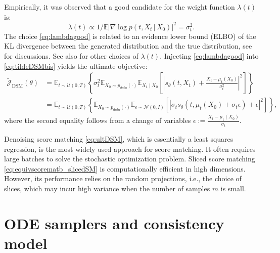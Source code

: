 \documentclass[letterpaper,11pt,reqno]{amsart}
\numberwithin{equation}{section}
\begin{document}
\quad Empirically,
it was observed \cite{Song20} that 
a good candidate for the weight function $\lambda(t)$ is:
\begin{equation}
\label{eq:lambdagood}
\lambda(t) \propto 1 / \mathbb{E}\left|\nabla \log p(t,X_t \,|\, X_0)\right|^2=\sigma_t^2.
\end{equation}
The choice \eqref{eq:lambdagood}
is related to an evidence lower bound (ELBO) of 
the KL divergence between the generated distribution and the true distribution, 
see \cite{huang2021variational, luo2022understanding, Song21} for discussions.
See also \cite{KG23} for other choices of $\lambda(t)$.
Injecting \eqref{eq:lambdagood} into \eqref{eq:tildeDSMbis}
yields the ultimate objective:
\begin{equation}
\label{eq:ultDSM}
\begin{aligned}
\tilde{\mathcal{J}}_{\text{DSM}}(\theta)&=\mathbb{E}_{t\sim\mathcal{U}(0, T)}\left\{\sigma_t^2 \mathbb{E}_{X_0\sim p_{data}(\cdot)} \mathbb{E}_{X_t \mid X_0}\left[\left|s_{\theta}(t,X_t) + \frac{X_t - \mu_t(X_0)}{\sigma_t^2}\right|^2\right]\right\}\\
& = \mathbb{E}_{t\sim\mathcal{U}(0, T)}\left\{ \mathbb{E}_{X_0\sim p_{data}(\cdot)} \mathbb{E}_{\epsilon \sim\mathcal{N}(0,I)}\left[\left|\sigma_t s_{\theta}(t,\mu_{t}(X_0)+\sigma_t\epsilon)+\epsilon \right|^2\right]\right\},
\end{aligned}
\end{equation}
where the second equality 
follows from a change of variables $\epsilon:= \frac{X_t - \mu_t(X_0)}{\sigma_t}$.

\quad Denoising score matching  \eqref{eq:ultDSM}, which is essentially a least squares regression, 
is the most widely used approach for score matching.
It often requires large batches to solve the stochastic optimization problem.
Sliced score matching \eqref{eq:equivscorematb_slicedSM} is computationally efficient in high dimensions.
However, its performance relies on the random projections, i.e., the choice of slices,
which may incur high variance when the number of samples $m$ is small.


\section{ODE samplers and consistency model}
\label{sc6}
\end{document}
